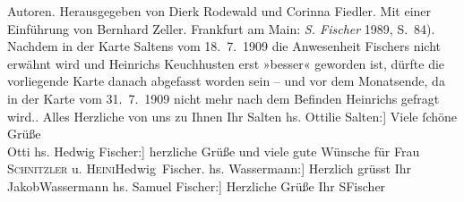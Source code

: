 \begin{ledgroupsized}[t]{13cm}
{{{{                              Autoren}. Herausgegeben von Dierk Rodewald und Corinna Fiedler. Mit
                           einer Einführung von Bernhard Zeller. Frankfurt am Main:
                           \emph{S. Fischer}{ }1989, S. 84). Nachdem in der Karte Saltens vom 18. 7. 1909 die Anwesenheit Fischers nicht erwähnt wird und Heinrichs Keuchhusten erst »besser« geworden ist, dürfte die vorliegende Karte
                  danach abgefasst worden sein – und vor dem Monatsende, da in der Karte vom 31. 7. 1909 nicht mehr nach
                  dem Befinden Heinrichs gefragt
               wird.}}}\label{K_L03504-1h}. Alles Herzliche von uns zu Ihnen\pend
           \pstart Ihr \spacefill\mbox{Salten}\pend{}\pstart
           \noindent{}{[}hs. Ottilie Salten:{]} Viele ſchöne Grüße {\\}\spacefill\mbox{Otti}\pend
           \pstart
           \noindent{}{[}hs. Hedwig Fischer:{]} herzliche Grüße und viele gute Wünsche für Frau \textsc{Schnitzler} u. \textsc{Heini}\spacefill\mbox{Hedwig Fischer.}\pend
           \pstart
           \noindent{}{[}hs. Wassermann:{]} Herzlich grüsst Ihr \spacefill\mbox{JakobWassermann}\pend
           \pstart
           \noindent{}{[}hs. Samuel Fischer:{]} Herzliche Grüße Ihr \spacefill\mbox{SFischer}\pend
           
         
         \endnumbering{}\end{ledgroupsized}  \newcommand{\dateiname}{L03504}\newcommand{\titel}{Felix Salten u. a. an Arthur Schnitzler, [zwischen 19. und 30. 7.? 1909]}\newcommand{\editorInnen}{Martin Anton Müller und Laura Untner}
      